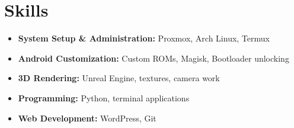 \documentclass[a4paper,10pt]{article}
\begin{document}
\section*{Skills}
\begin{itemize}[left=0em, itemsep=3pt]
    \item \textbf{System Setup \& Administration:} Proxmox, Arch Linux, Termux
    \item \textbf{Android Customization:} Custom ROMs, Magisk, Bootloader unlocking
    \item \textbf{3D Rendering:} Unreal Engine, textures, camera work
    \item \textbf{Programming:} Python, terminal applications
    \item \textbf{Web Development:} WordPress, Git
\end{itemize}
\end{document}
